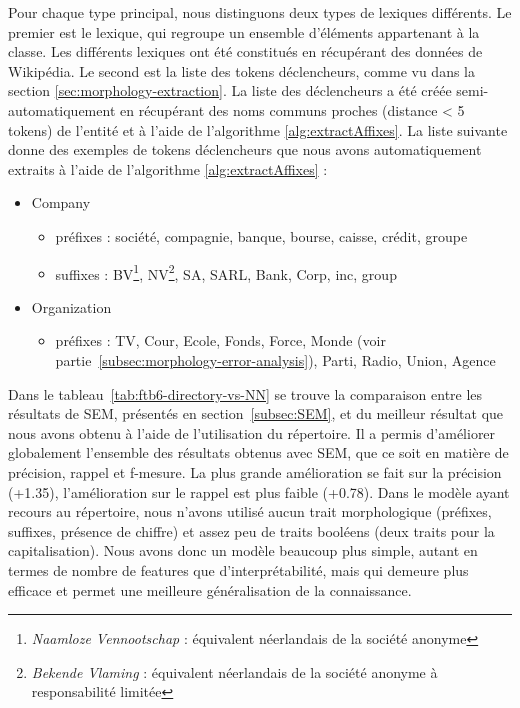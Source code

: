 \documentclass[12pt,a4paper,times,twoside,openright]{report}
\begin{document}
Pour chaque type principal, nous distinguons deux types de lexiques différents. Le premier est le lexique, qui regroupe un ensemble d'éléments appartenant à la classe. Les différents lexiques ont été constitués en récupérant des données de Wikipédia. Le second est la liste des tokens déclencheurs, comme vu dans la section \ref{sec:morphology-extraction}. La liste des déclencheurs a été créée semi-automatiquement en récupérant des noms communs proches (distance < 5 tokens) de l'entité et à l'aide de l'algorithme \ref{alg:extractAffixes}. La liste suivante donne des exemples de tokens déclencheurs que nous avons automatiquement extraits à l'aide de l'algorithme \ref{alg:extractAffixes} :
\begin{itemize}
    \item Company
        \begin{itemize}
            \item préfixes : société, compagnie, banque, bourse, caisse, crédit, groupe
            \item suffixes : BV\footnote{\emph{Naamloze Vennootschap} : équivalent néerlandais de la société anonyme}, NV\footnote{\emph{Bekende Vlaming} : équivalent néerlandais de la société anonyme à responsabilité limitée}, SA, SARL, Bank, Corp, inc, group
        \end{itemize}
    \item Organization
        \begin{itemize}
            \item préfixes : TV, Cour, Ecole, Fonds, Force, Monde (voir partie\ \ref{subsec:morphology-error-analysis}), Parti, Radio, Union, Agence
        \end{itemize}
\end{itemize}

Dans le tableau\ \ref{tab:ftb6-directory-vs-NN} se trouve la comparaison entre les résultats de SEM, présentés en section\ \ref{subsec:SEM}, et du meilleur résultat que nous avons obtenu à l'aide de l'utilisation du répertoire. Il a permis d'améliorer globalement l'ensemble des résultats obtenus avec SEM, que ce soit en matière de précision, rappel et f-mesure. La plus grande amélioration se fait sur la précision (+1.35), l'amélioration sur le rappel est plus faible (+0.78). Dans le modèle ayant recours au répertoire, nous n'avons utilisé aucun trait morphologique (préfixes, suffixes, présence de chiffre) et assez peu de traits booléens (deux traits pour la capitalisation). Nous avons donc un modèle beaucoup plus simple, autant en termes de nombre de features que d'interprétabilité, mais qui demeure plus efficace et permet une meilleure généralisation de la connaissance.
\end{document}

